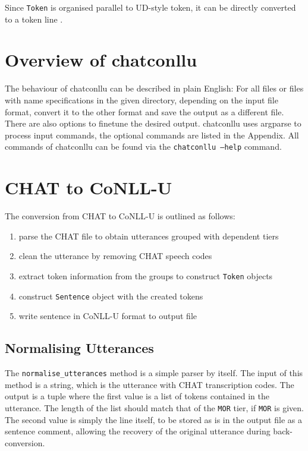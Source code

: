 Since \texttt{Token} is organised parallel to UD-style token, it can be directly converted to a token line .

\section{Overview of chatconllu}

The behaviour of chatconllu can be described in plain English: For all files or files with name specifications in the given directory, depending on the input file format, convert it to the other format and save the output as a different file. There are also options to finetune the desired output. chatconllu uses argparse to process input commands, the optional commands are listed in the Appendix. All commands of chatconllu can be found via the \texttt{chatconllu --help} command.

\section{CHAT to CoNLL-U}

The conversion from CHAT to CoNLL-U is outlined as follows:
\begin{enumerate}
	\item parse the CHAT file to obtain utterances grouped with dependent tiers
	\item clean the utterance by removing CHAT speech codes
	\item extract token information from the groups to construct \texttt{Token} objects
	\item construct \texttt{Sentence} object with the created tokens
	\item write sentence in CoNLL-U format to output file
\end{enumerate}

\subsection{Normalising Utterances}

The \texttt{normalise\_utterances} method is a simple parser by itself. The input of this method is a string, which is the utterance with CHAT transcription codes. The output is a tuple where the first value is a list of tokens contained in the utterance. The length of the list should match that of the \texttt{MOR} tier, if \texttt{MOR} is given. The second value is simply the line itself, to be stored as is in the output file as a sentence comment, allowing the recovery of the original utterance during back-conversion.

